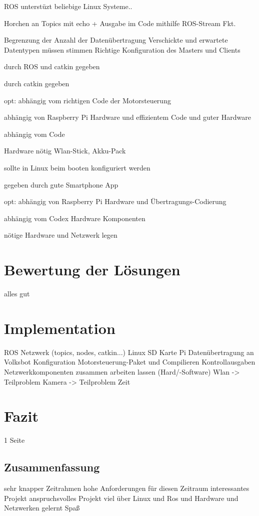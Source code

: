 \documentclass[12pt]{article}
\begin{document}
ROS unterstüzt beliebige Linux Systeme..

Horchen an Topics mit echo + Ausgabe im Code mithilfe ROS-Stream Fkt.

Begrenzung der Anzahl der Datenübertragung
Verschickte und erwartete Datentypen müssen stimmen
Richtige Konfiguration des Masters und Clients

durch ROS und catkin gegeben 

durch catkin gegeben

opt:
abhängig vom richtigen Code der Motorsteuerung

abhängig von Raspberry Pi Hardware und effizientem Code und
guter Hardware

abhängig vom Code

Hardware nötig Wlan-Stick, Akku-Pack 

sollte in Linux beim booten konfiguriert werden

gegeben durch gute Smartphone App

opt:
abhängig von Raspberry Pi Hardware und Übertragungs-Codierung

abhängig vom Codex Hardware Komponenten

nötige Hardware und Netzwerk legen

\section{Bewertung der Lösungen}

alles gut

\section{Implementation}

ROS Netzwerk (topics, nodes, catkin...)
Linux SD Karte Pi
Datenübertragung an Volksbot
Konfiguration Motorsteuerung-Paket und Compilieren
Kontrollausgaben 
Netzwerkkomponenten zusammen arbeiten lassen (Hard/-Software)
Wlan -> Teilproblem
Kamera -> Teilproblem Zeit


\section{Fazit}
1 Seite
\subsection{Zusammenfassung}

sehr knapper Zeitrahmen
hohe Anforderungen für diesen Zeitraum
interessantes Projekt
anspruchsvolles Projekt
viel über Linux und Ros und Hardware und Netzwerken gelernt
Spaß
\end{document}
